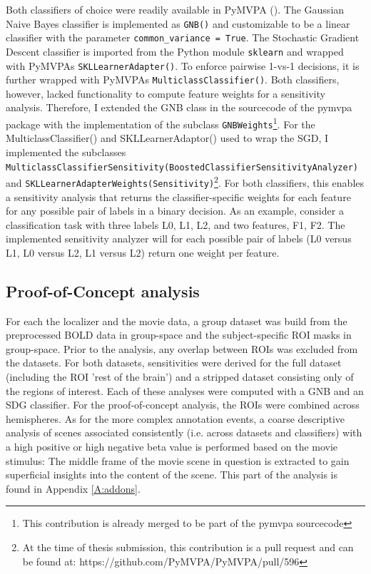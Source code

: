 \documentclass[a4paper, 12pt]{scrreprt}
\begin{document}
Both classifiers of choice were readily available in PyMVPA (\cite{hanke2009pymvpa}). The Gaussian Naive Bayes classifier is implemented as \texttt{GNB()} and customizable to be a linear classifier with the parameter \texttt{common\_variance = True}. The Stochastic Gradient Descent classifier is imported from the Python module \texttt{sklearn} and wrapped with PyMVPAs \texttt{SKLLearnerAdapter()}. To enforce pairwise 1-vs-1 decisions, it is further wrapped with PyMVPAs \texttt{MulticlassClassifier()}. \newline
Both classifiers, however, lacked functionality to compute feature weights for a sensitivity analysis. Therefore, I extended the GNB class in the sourcecode of the pymvpa package with the implementation of the subclass \texttt{GNBWeights}\footnote{This contribution is already merged to be part of the pymvpa sourcecode}. For the MulticlassClassifier() and SKLLearnerAdaptor() used to wrap the SGD, I implemented the subclasses \newline \texttt{MulticlassClassifierSensitivity(BoostedClassifierSensitivityAnalyzer)} and  \texttt{SKLLearnerAdapterWeights(Sensitivity)}\footnote{At the time of thesis submission, this contribution is a pull request and can be found at: https://github.com/PyMVPA/PyMVPA/pull/596}. For both classifiers, this enables a sensitivity analysis that returns the classifier-specific weights for each feature for any possible pair of labels in a binary decision. As an example, consider a classification task with three labels L0, L1, L2, and two features, F1, F2. The implemented sensitivity analyzer will for each possible pair of labels (L0 versus L1, L0 versus L2, L1 versus L2) return one weight per feature. 

\subsection{Proof-of-Concept analysis}

For each the localizer and the movie data, a group dataset was build from the preprocessed BOLD data in group-space and the subject-specific ROI masks in group-space. Prior to the analysis, any overlap between ROIs was excluded from the datasets.
For both datasets, sensitivities were derived for the full dataset (including the ROI 'rest of the brain') and a stripped dataset consisting only of the regions of interest. Each of these analyses were computed with a GNB and an SDG classifier. For the proof-of-concept analysis, the ROIs were combined across hemispheres. As for the more complex annotation events, a coarse descriptive analysis of scenes associated consistently (i.e. across datasets and classifiers) with a high positive or high negative beta value is performed based on the movie stimulus: The middle frame of the movie scene in question is extracted to gain superficial insights into the content of the scene. This part of the analysis is found in Appendix \ref{A:addons}.
\end{document}
